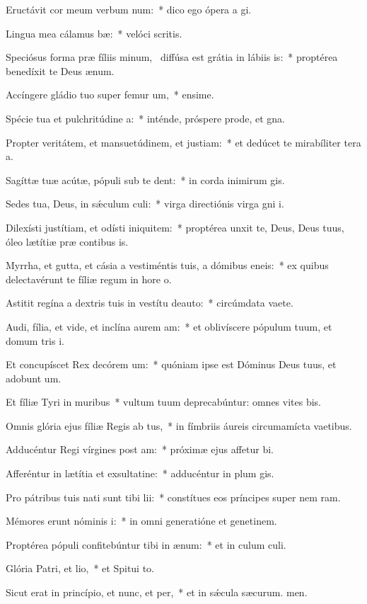 \item Eructávit cor meum verbum num:~* dico ego ópera a gi.
\item Lingua mea cálamus bæ:~* velóci scritis.
\item Speciósus forma præ fíliis minum,~\pscross{} diffúsa est grátia in lábiis is:~* proptérea benedíxit te Deus  ænum.
\item Accíngere gládio tuo super femur um,~* ensime.
\item Spécie tua et pulchritúdine a:~* inténde, próspere prode, et gna.
\item Propter veritátem, et mansuetúdinem, et justiam:~* et dedúcet te mirabíliter tera a.
\item Sagíttæ tuæ acútæ, pópuli sub te dent:~* in corda inimirum gis.
\item Sedes tua, Deus, in sǽculum culi:~* virga directiónis virga gni i.
\item Dilexísti justítiam, et odísti iniquitem:~* proptérea unxit te, Deus, Deus tuus, óleo lætítiæ præ contibus is.
\item Myrrha, et gutta, et cásia a vestiméntis tuis, a dómibus eneis:~* ex quibus delectavérunt te fíliæ regum in hore o.
\item Astitit regína a dextris tuis in vestítu deauto:~* circúmdata vaete.
\item Audi, fília, et vide, et inclína aurem am:~* et oblivíscere pópulum tuum, et domum tris i.
\item Et concupíscet Rex decórem um:~* quóniam ipse est Dóminus Deus tuus, et adobunt um.
\item Et fíliæ Tyri in muribus~* vultum tuum deprecabúntur: omnes vites bis.
\item Omnis glória ejus fíliæ Regis ab tus,~* in fímbriis áureis circumamícta vaetibus.
\item Adducéntur Regi vírgines post am:~* próximæ ejus affetur bi.
\item Afferéntur in lætítia et exsultatine:~* adducéntur in plum gis.
\item Pro pátribus tuis nati sunt tibi lii:~* constítues eos príncipes super nem ram.
\item Mémores erunt nóminis i:~* in omni generatióne et genetinem.
\item Proptérea pópuli confitebúntur tibi in ænum:~* et in culum culi.
\item Glória Patri, et lio,~* et Spitui to.
\item Sicut erat in princípio, et nunc, et per,~* et in sǽcula sæcurum. men.
